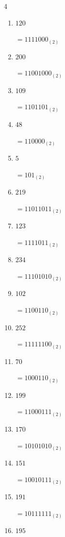 \begin{multicols}{4}
\begin{enumerate}
        $=11011100_{(2)}$

  \item $120$

        $=1111000_{(2)}$

  \item $200$

        $=11001000_{(2)}$

  \item $109$

        $=1101101_{(2)}$

  \item $48$

        $=110000_{(2)}$

  \item $5$

        $=101_{(2)}$

  \item $219$

        $=11011011_{(2)}$

  \item $123$

        $=1111011_{(2)}$

  \item $234$

        $=11101010_{(2)}$

  \item $102$

        $=1100110_{(2)}$

  \item $252$

        $=11111100_{(2)}$

  \item $70$

        $=1000110_{(2)}$

  \item $199$

        $=11000111_{(2)}$

  \item $170$

        $=10101010_{(2)}$

  \item $151$

        $=10010111_{(2)}$

\columnbreak %

  \item $191$

        $=10111111_{(2)}$

  \item $195$


\end{enumerate}
\end{multicols}
